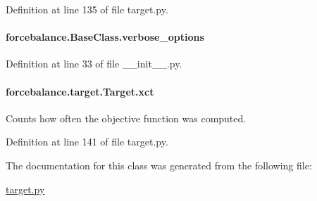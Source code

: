 Definition at line 135 of file target.\-py.

\hypertarget{classforcebalance_1_1BaseClass_afd68efa29ccd2f320f4cf82198214aac}{
\paragraph[{verbose\-\_\-options}]{\setlength{\rightskip}{0pt plus 5cm}forcebalance.\-Base\-Class.\-verbose\-\_\-options\hspace{0.3cm}{\ttfamily [inherited]}}}\label{classforcebalance_1_1BaseClass_afd68efa29ccd2f320f4cf82198214aac}


Definition at line 33 of file \-\_\-\-\_\-init\-\_\-\-\_\-.\-py.

\hypertarget{classforcebalance_1_1target_1_1Target_aad2e385cfbf7b4a68f1c2cb41133fe82}{
\paragraph[{xct}]{\setlength{\rightskip}{0pt plus 5cm}forcebalance.\-target.\-Target.\-xct\hspace{0.3cm}{\ttfamily [inherited]}}}\label{classforcebalance_1_1target_1_1Target_aad2e385cfbf7b4a68f1c2cb41133fe82}


Counts how often the objective function was computed. 



Definition at line 141 of file target.\-py.



The documentation for this class was generated from the following file\-:\begin{DoxyCompactItemize}
\item 
\hyperlink{target_8py}{target.\-py}\end{DoxyCompactItemize}
